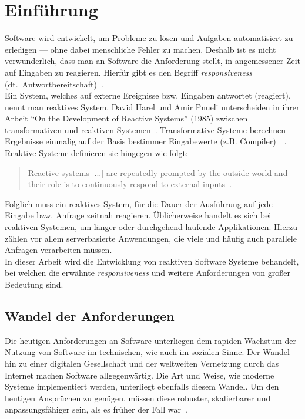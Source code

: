 \chapter{Einführung}\label{sec:einfuehrung}
Software wird entwickelt, um Probleme zu lösen und Aufgaben automatisiert zu erledigen --- ohne dabei menschliche Fehler zu machen. Deshalb ist es nicht verwunderlich, dass man an Software die Anforderung stellt, in angemessener Zeit auf Eingaben zu reagieren. Hierfür gibt es den Begriff \textit{responsiveness} (dt.\ Antwortbereitschaft)~\cite[S.~18]{kuhn_reactive_2015}.\\
Ein System, welches auf externe Ereignisse bzw. Eingaben antwortet (reagiert), nennt man reaktives System. David Harel und Amir Pnueli unterscheiden in ihrer Arbeit \enquote{On the Development of Reactive Systems} (1985) zwischen transformativen und reaktiven Systemen~\cite{harel_development_1985}. Transformative Systeme berechnen Ergebnisse einmalig auf der Basis bestimmer Eingabewerte (z.B. Compiler)~\cite[S.~2]{carkci_dataflow_2014}~\cite{wieringa_design_2003}. Reaktive Systeme definieren sie hingegen wie folgt:

\begin{quotation}
  Reactive systems [...] are repeatedly prompted by the outside world and their role is to continuously respond to external inputs~\cite{harel_development_1985}.
\end{quotation}

Folglich muss ein reaktives System, für die Dauer der Ausführung auf jede Eingabe bzw. Anfrage zeitnah reagieren. Üblicherweise handelt es sich bei reaktiven Systemen, um länger oder durchgehend laufende Applikationen. Hierzu zählen vor allem serverbasierte Anwendungen, die viele und häufig auch parallele Anfragen verarbeiten müssen.\\
In dieser Arbeit wird die Entwicklung von reaktiven Software Systeme behandelt, bei welchen die erwähnte \textit{responsiveness} und weitere Anforderungen von großer Bedeutung sind.

\pagebreak

\section{Wandel der Anforderungen}
Die heutigen Anforderungen an Software unterliegen dem rapiden Wachstum der Nutzung von Software im technischen, wie auch im sozialen Sinne. Der Wandel hin zu einer digitalen Gesellschaft und der weltweiten Vernetzung durch das Internet machen Software allgegenwärtig. Die Art und Weise, wie moderne Systeme implementiert werden, unterliegt ebenfalls diesem Wandel. Um den heutigen Ansprüchen zu genügen, müssen diese robuster, skalierbarer und anpassungsfähiger sein, als es früher der Fall war~\cite{boner_reactive_2014}.\\

